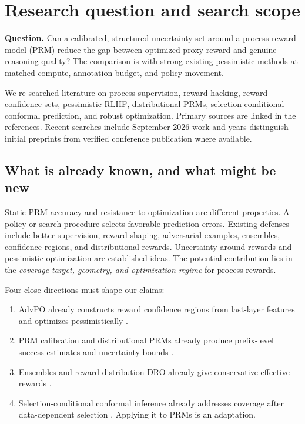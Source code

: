 \section{Research question and search scope}
\label{sec:review}
\textbf{Question.} Can a calibrated, structured uncertainty set around a process
reward model (PRM) reduce the gap between optimized proxy reward and genuine
reasoning quality? The comparison is with strong existing pessimistic methods
at matched compute, annotation budget, and policy movement.

We re-searched literature on process supervision, reward hacking, reward confidence
sets, pessimistic RLHF, distributional PRMs, selection-conditional conformal
prediction, and robust optimization. Primary sources are linked in the references.
Recent searches include September 2026 work and years distinguish initial preprints
from verified conference publication where available.

\subsection{What is already known, and what might be new}
Static PRM accuracy and resistance to optimization are different properties.
A policy or search procedure selects favorable prediction errors. Existing
defenses include better supervision, reward shaping, adversarial examples,
ensembles, confidence regions, and distributional rewards. Uncertainty around
rewards and pessimistic optimization are established ideas. The
potential contribution lies in the \emph{coverage target, geometry, and
optimization regime} for process rewards. 

Four close directions must shape our claims:
\begin{enumerate}
\item AdvPO already constructs reward confidence regions from last-layer features
and optimizes pessimistically \cite{advpo}.
\item PRM calibration and distributional PRMs already produce prefix-level
success estimates and uncertainty bounds \cite{park,otprm}.
\item Ensembles and reward-distribution DRO already give conservative effective
rewards \cite{coste,unifying,rrlhf}.
\item Selection-conditional conformal inference already addresses coverage after
data-dependent selection \cite{jomi}. Applying it to PRMs is an adaptation.
\end{enumerate}

